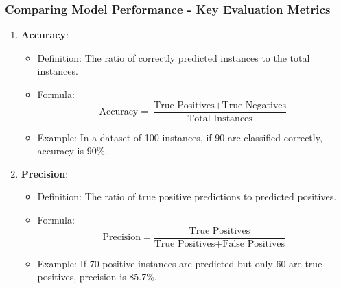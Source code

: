 \documentclass[aspectratio=169]{beamer}
\begin{document}
\begin{frame}[fragile]
    \frametitle{Comparing Model Performance - Key Evaluation Metrics}
    \begin{enumerate}
        \item \textbf{Accuracy}:
            \begin{itemize}
                \item Definition: The ratio of correctly predicted instances to the total instances.
                \item Formula: 
                \begin{equation}
                    \text{Accuracy} = \frac{\text{True Positives} + \text{True Negatives}}{\text{Total Instances}}
                \end{equation}
                \item Example: In a dataset of 100 instances, if 90 are classified correctly, accuracy is 90\%.
            \end{itemize}
        
        \item \textbf{Precision}:
            \begin{itemize}
                \item Definition: The ratio of true positive predictions to predicted positives.
                \item Formula: 
                \begin{equation}
                    \text{Precision} = \frac{\text{True Positives}}{\text{True Positives} + \text{False Positives}}
                \end{equation}
                \item Example: If 70 positive instances are predicted but only 60 are true positives, precision is 85.7\%.
            \end{itemize}
    \end{enumerate}
\end{frame}
\end{document}
